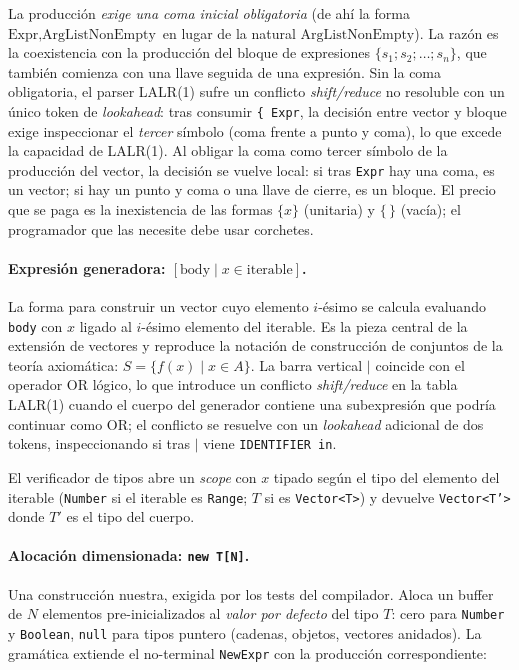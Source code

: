 \documentclass[11pt,a4paper,oneside,openany]{report}
\newcommand{\code}[1]{\texttt{#1}}
\begin{document}
La producción \emph{exige una coma inicial obligatoria} (de ahí la forma
$\text{Expr}, \text{ArgListNonEmpty}$ en lugar de la natural
$\text{ArgListNonEmpty}$). La razón es la coexistencia con la producción
del bloque de expresiones $\{ s_1; s_2; \ldots; s_n \}$, que también
comienza con una llave seguida de una expresión. Sin la coma obligatoria,
el parser LALR(1) sufre un conflicto \emph{shift/reduce} no resoluble con
un único token de \emph{lookahead}: tras consumir \code{\{ Expr}, la
decisión entre vector y bloque exige inspeccionar el \emph{tercer} símbolo
(coma frente a punto y coma), lo que excede la capacidad de LALR(1). Al
obligar la coma como tercer símbolo de la producción del vector, la
decisión se vuelve local: si tras \code{Expr} hay una coma, es un vector;
si hay un punto y coma o una llave de cierre, es un bloque. El precio que
se paga es la inexistencia de las formas $\{x\}$ (unitaria) y $\{\,\}$
(vacía); el programador que las necesite debe usar corchetes.

\paragraph{Expresión generadora: $[\text{body} \mid x \in \text{iterable}]$.}
La forma para construir un vector cuyo elemento $i$-ésimo se calcula
evaluando \code{body} con $x$ ligado al $i$-ésimo elemento del iterable.
Es la pieza central de la extensión de vectores y reproduce la notación de
construcción de conjuntos de la teoría axiomática: $S = \{ f(x) \mid x \in
A \}$. La barra vertical $\vert$ coincide con el operador OR lógico, lo
que introduce un conflicto \emph{shift/reduce} en la tabla LALR(1) cuando
el cuerpo del generador contiene una subexpresión que podría continuar
como OR; el conflicto se resuelve con un \emph{lookahead} adicional de dos
tokens, inspeccionando si tras $\vert$ viene \code{IDENTIFIER in}.

El verificador de tipos abre un \emph{scope} con $x$ tipado según el tipo
del elemento del iterable (\code{Number} si el iterable es \code{Range};
$T$ si es \code{Vector<T>}) y devuelve \code{Vector<T'>} donde $T'$ es el
tipo del cuerpo.

\paragraph{Alocación dimensionada: \code{new T[N]}.}
Una construcción nuestra, exigida por los tests del compilador. Aloca un
buffer de $N$ elementos pre-inicializados al \emph{valor por defecto} del
tipo $T$: cero para \code{Number} y \code{Boolean}, \code{null} para
tipos puntero (cadenas, objetos, vectores anidados). La gramática extiende
el no-terminal \code{NewExpr} con la producción correspondiente:
\end{document}
